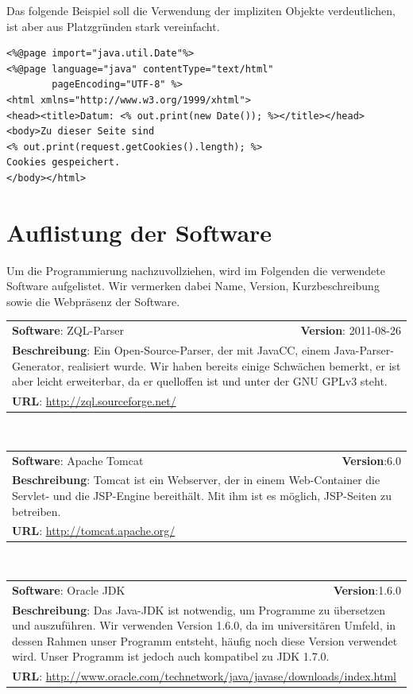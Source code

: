 Das folgende Beispiel soll die Verwendung der impliziten Objekte verdeutlichen, ist aber aus Platzgründen stark vereinfacht.
\lstset{language=Java}
\begin{lstlisting}
<%@page import="java.util.Date"%>
<%@page language="java" contentType="text/html" 
		pageEncoding="UTF-8" %>
<html xmlns="http://www.w3.org/1999/xhtml">
<head><title>Datum: <% out.print(new Date()); %></title></head>
<body>Zu dieser Seite sind 
<% out.print(request.getCookies().length); %> 
Cookies gespeichert.
</body></html>
\end{lstlisting}

\section{Auflistung der Software}

Um die Programmierung nachzuvollziehen, wird im Folgenden die verwendete Software aufgelistet. Wir vermerken dabei Name, Version, Kurzbeschreibung sowie die Webpräsenz der Software.

\begin{tabular}{p{9cm}r}
\textbf{Software}: ZQL-Parser & \textbf{Version}: 2011-08-26\\
\multicolumn{2}{p{1\textwidth}}{\textbf{Beschreibung}: Ein Open-Source-Parser, der mit JavaCC, einem Java-Parser-Generator, realisiert wurde. Wir haben bereits einige Schwächen bemerkt, er ist aber leicht erweiterbar, da er quelloffen ist und unter der GNU GPLv3 steht.}\\
\multicolumn{2}{l}{\textbf{URL}: \url{http://zql.sourceforge.net/}}
\end{tabular}\\

\begin{tabular}{p{9cm}r}
\textbf{Software}: Apache Tomcat & \textbf{Version}:6.0\\
\multicolumn{2}{p{1\textwidth}}{\textbf{Beschreibung}: Tomcat ist ein Webserver, der in einem Web-Container die Servlet- und die JSP-Engine bereithält. Mit ihm ist es möglich, JSP-Seiten zu betreiben.}\\
\multicolumn{2}{l}{\textbf{URL}: \url{http://tomcat.apache.org/}}
\end{tabular}\\

\begin{tabular}{p{9cm}r}
\textbf{Software}: Oracle JDK  & \textbf{Version}:1.6.0\\
\multicolumn{2}{p{1\textwidth}}{\textbf{Beschreibung}: Das Java-JDK ist notwendig, um Programme zu übersetzen und auszuführen. Wir verwenden Version 1.6.0, da im universitären Umfeld, in dessen Rahmen unser Programm entsteht, häufig noch diese Version verwendet wird. Unser Programm ist jedoch auch kompatibel zu JDK 1.7.0.}\\
\multicolumn{2}{l}{\textbf{URL}: \url{http://www.oracle.com/technetwork/java/javase/downloads/index.html}}
\end{tabular}\\

